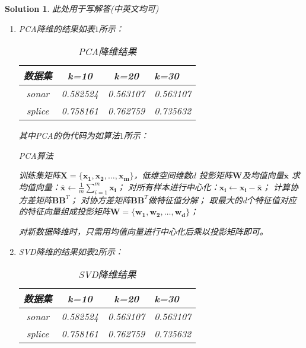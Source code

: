 \documentclass[a4paper,UTF8]{article}
\numberwithin{equation}{section}
\newtheorem*{solution}{Solution}
\begin{document}
\begin{solution}
	此处用于写解答(中英文均可)
	\begin{enumerate}
	\item PCA降维的结果如表$1$所示：
	\begin{table}[htbp]
  		\centering
  		\begin{tabular}{cccp{38mm}}
	    \toprule
	    \textbf{数据集} & \textbf{k=10} & \textbf{k=20} & \textbf{k=30} \\
	    \midrule
	    sonar  & 0.582524 & 0.563107 & 0.563107\\
	    splice & 0.758161 & 0.762759 & 0.735632\\
	    \bottomrule
  		\end{tabular}
  		\caption{PCA降维结果}\label{table:1}
	\end{table}

	其中PCA的伪代码为如算法$1$所示：
	   	\begin{algorithm}[htbp]  
	        \caption{PCA算法}  
	        \begin{algorithmic}[1] %
	            \Require 训练集矩阵$\mathbf{X}=\{\mathbf{x_1}, \mathbf{x_2},\dots,\mathbf{x_m}\}$，低维空间维数$d$ 
	            \Ensure 投影矩阵$\mathbf{W}$及均值向量$\bar{\mathbf{x}}$  
	            \State 求均值向量：$\bar{\mathbf{x}} \gets \frac{1}{m}\sum_{i=1}^{m}\mathbf{x_i}$；
	            \State 对所有样本进行中心化：$\mathbf{x_i} \gets \mathbf{x_i} - \bar{\mathbf{x}}$；
	            \State 计算协方差矩阵$\mathbf{B}\mathbf{B}^T$；
	            \State 对协方差矩阵$\mathbf{B}\mathbf{B}^T$做特征值分解；
	            \State 取最大的d个特征值对应的特征向量组成投影矩阵$\mathbf{W}=\{\mathbf{w_1}, \mathbf{w_2},\dots,\mathbf{w_d}\}$；
	            \State {}
	        \end{algorithmic}  
    	\end{algorithm} 

    对新数据降维时，只需用均值向量进行中心化后乘以投影矩阵即可。
	\item SVD降维的结果如表$2$所示：
	\begin{table}[htbp]
  		\centering
  		\begin{tabular}{cccp{38mm}}
	    \toprule
	    \textbf{数据集} & \textbf{k=10} & \textbf{k=20} & \textbf{k=30} \\
	    \midrule
	    sonar  & 0.582524 & 0.563107 & 0.563107\\
	    splice & 0.758161 & 0.762759 & 0.735632\\
	    \bottomrule
  		\end{tabular}
  		\caption{SVD降维结果}\label{table:1}
	\end{table}


\end{enumerate}
\end{solution}
\end{document}
